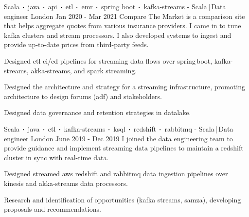 \begin{cventries}
    \cventry
    {Scala$\sqbig$java$\sqbig$api$\sqbig$etl$\sqbig$emr$\sqbig$spring boot$\sqbig$kafka-streams}
    { - Scala\,|\,Data engineer}
    {London}
    {Jan 2020 - Mar 2021}
    {Compare The Market is a comparison site that helps aggregate quotes from various insurance providers. I came in to tune kafka clusters and stream processors. I also developed systems to ingest and provide up-to-date prices from third-party feeds.}
    {
        \begin{cvitems}
            \item{Designed etl ci/cd pipelines for streaming data flows over spring\,boot, kafka-streams, akka-streams, and spark streaming.}
            \item{Designed the architecture and strategy for a streaming infrastructure, promoting architecture to design forums (adf) and stakeholders.}
            \item{Designed data governance and retention strategies in datalake.}
        \end{cvitems}
    }

    \cventry
    {Scala$\sqbig$java$\sqbig$etl$\sqbig$kafka-streams$\sqbig$ksql$\sqbig$redshift$\sqbig$rabbitmq}
    { - Scala\,|\,Data engineer}
    {London}
    {June 2019 - Dec 2019}
    {I joined the data engineering team to provide guidance and implement streaming data pipelines to maintain a redshift cluster in sync with real-time data.}
    {
        \begin{cvitems}
            \item{Designed streamed aws redshift and rabbitmq data ingestion pipelines over kinesis and akka-streams data processors. }
            \item{Research and identification of opportunities (kafka streams, samza), developing proposals and recommendations.}
        \end{cvitems}
    }


\end{cventries}
